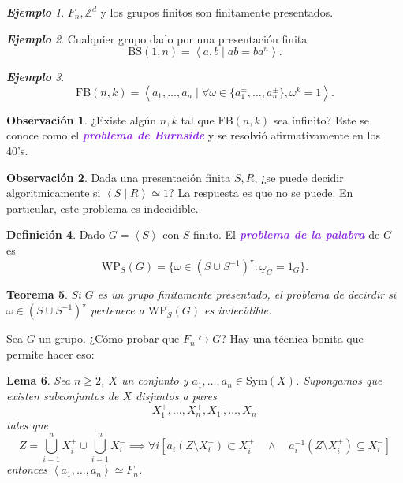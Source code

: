 \documentclass{article}
\newtheorem{theorem}{Teorema}[subsection]
\newtheorem{lemma}[theorem]{Lema}
\theoremstyle{definition}
\newtheorem{definition}[theorem]{Definición}
\newtheorem*{obs}{Observación}
\theoremstyle{remark}
\newtheorem{example}[theorem]{\textbf{Ejemplo}}
\numberwithin{equation}{section}
\newcommand{\Z}{\mathbb{Z}}
\newcommand{\w}{\omega}
\newcommand{\embed}{\hookrightarrow}
\newcommand{\Sym}{\mathrm{Sym}}
\newcommand{\cor}[1]{\left[ #1 \right]}
\newcommand{\gen}[1]{\left\langle #1 \right\rangle}
\newcommand{\wea}[1]{\textcolor{BlueViolet}{\textbf{\emph{#1}}}}
\begin{document}
\begin{example}
  $F_n, \Z^d$ y los grupos finitos son finitamente presentados.
\end{example}

\begin{example}
  Cualquier grupo dado por una presentación finita
  \[\mathrm{BS}(1,n) = \gen{a,b \mid ab=ba^n}.\]
\end{example}

\begin{example}
  $$\mathrm{FB}(n,k) = \gen{a_1,\dots,a_n \mid \forall \w \in \{a_1^\pm, \dots, a_n^\pm\}, \w^k = 1}.$$
\end{example}

\begin{obs}
  ¿Existe algún $n,k$ tal que $\mathrm{FB}(n,k)$ sea infinito? Este se conoce como el \wea{problema de Burnside} y se resolvió afirmativamente en los 40's.
\end{obs}

\begin{obs}
  Dada una presentación finita $S,R$, ¿se puede decidir algoritmicamente si $\gen{S \mid R} \simeq 1$? La respuesta es que no se puede. En particular, este problema es indecidible.
\end{obs}

\begin{definition}
  Dado $G = \gen{S}$ con $S$ finito. El \wea{problema de la palabra} de $G$ es
  \[\mathrm{WP}_S(G) = \{\w \in (S \cup S^{-1})^\star : \underline{\w}_G = 1_G\}.\]
\end{definition}

\begin{theorem}
  Si $G$ es un grupo finitamente presentado, el problema de decirdir si $\w \in (S \cup S^{-1})^\star$ pertenece a $\mathrm{WP}_S(G)$ es indecidible.
\end{theorem}

Sea $G$ un grupo. ¿Cómo probar que $F_n \embed G$? Hay una técnica bonita que permite hacer eso:

\begin{lemma}
  Sea $n \geq 2$, $X$ un conjunto y $a_1, \dots, a_n \in \Sym(X)$. Supongamos que existen subconjuntos de $X$ disjuntos a pares
  \[X_1^+, \dots, X_n^+, X_1^-, \dots, X_n^-\]
  tales que
  \[Z = \bigcup_{i=1}^n X_i^+ \cup \bigcup_{i=1}^n X_i^- \implies \forall i \cor{
    a_i (Z \setminus X_i^-) \subset X_i^+ \quad \land\quad a_i^{-1} (Z \setminus X_i^+) \subseteq X_i^-
  }\]
  entonces $\gen{a_1,\dots,a_n} \simeq F_n$.
\end{lemma}
\end{document}
